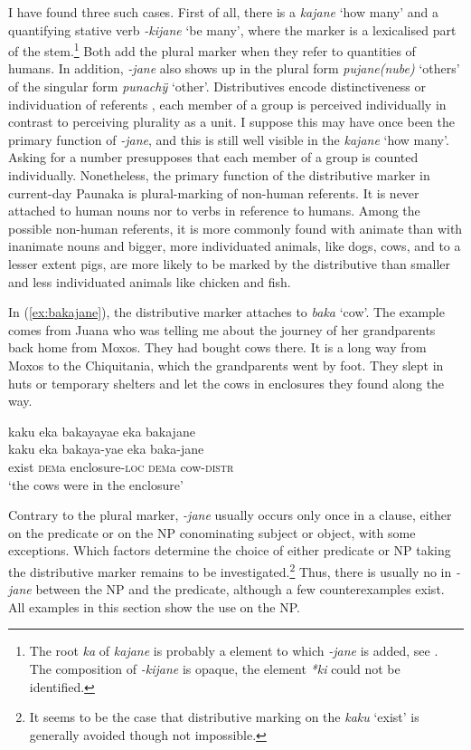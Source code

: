 I have found three such cases. First of all, there is a  \textit{kajane} ‘how many’ and a quantifying stative verb \textit{-kijane} ‘be many’, where the marker is a lexicalised part of the stem.\footnote{The root \textit{ka} of \textit{kajane} is probably a  element to which \textit{-jane} is added, see . The composition of \textit{-kijane} is opaque, the element \textit{*ki} could not be identified.} Both add the plural marker when they refer to quantities of humans. In addition, \textit{-jane} also shows up in the plural form \textit{pujane(nube)} ‘others’ of the singular form \textit{punachÿ} ‘other’. Distributives encode distinctiveness or individuation of referents \citep[116]{Corbett2000}, each member of a group is perceived individually in contrast to perceiving plurality as a unit. I suppose this may have once been the primary function of \textit{-jane}, and this is still well visible in the  \textit{kajane} ‘how many’. Asking for a number presupposes that each member of a group is counted individually. Nonetheless, the primary function of the distributive marker in current-day Paunaka is plural-marking of non-human referents. It is never attached to human nouns nor to verbs in reference to humans. Among the possible non-human referents, it is more commonly found with animate than with inanimate nouns and bigger, more individuated animals, like dogs, cows, and to a lesser extent pigs, are more likely to be marked by the distributive than smaller and less individuated animals like chicken and fish.

In (\ref{ex:bakajane}), the distributive marker attaches to \textit{baka} ‘cow’. The example comes from Juana who was telling me about the journey of her grandparents back home from Moxos. They had bought cows there. It is a long way from Moxos to the Chiquitania, which the grandparents went by foot. They slept in huts or temporary shelters and let the cows in enclosures they found along the way.

\ea\label{ex:bakajane}
\begingl 
\glpreamble kaku eka bakayayae eka bakajane\\
\gla kaku eka bakaya-yae eka baka-jane\\ 
\glb exist \textsc{dem}a enclosure-\textsc{loc} \textsc{dem}a cow-\textsc{distr}\\ 
\glft ‘the cows were in the enclosure’
\trailingcitation{[jxx-p151016l-2.030]}
\xe

Contrary to the plural marker, \textit{-jane} usually occurs only once in a clause, either on the predicate or on the NP conominating subject or object, with some exceptions. Which factors determine the choice of either predicate or NP taking the distributive marker remains to be investigated.\footnote{It seems to be the case that distributive marking on the  \textit{kaku} ‘exist’ is generally avoided though not impossible.} Thus, there is usually no  in \textit{-jane} between the NP and the predicate, although a few counterexamples exist. All examples in this section show the use on the NP.

